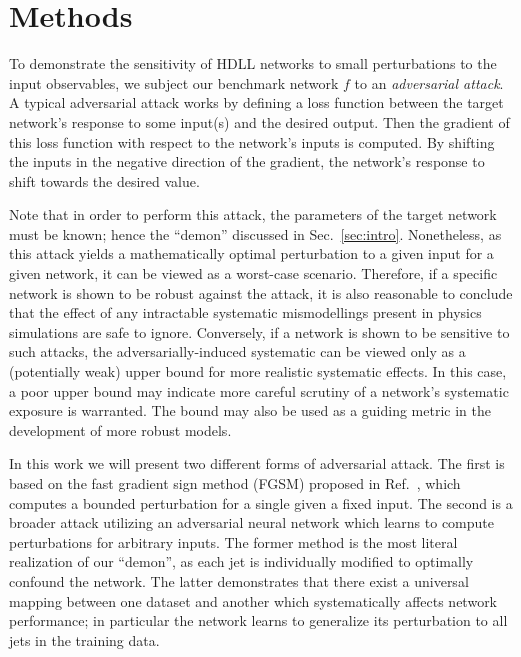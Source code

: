 \documentclass[reprint,nofootinbib,...]{revtex4-1}
\begin{document}

\section{Methods}
To demonstrate the sensitivity of HDLL networks to small perturbations to the input observables, we subject our benchmark network $f$ to an \textit{adversarial attack}.
A typical adversarial attack works by defining a loss function between the target network's response to some input(s) and the desired output.
Then the gradient of this loss function with respect to the network's inputs is computed.
By shifting the inputs in the negative direction of the gradient, the network's response to shift towards the desired value.

Note that in order to perform this attack, the parameters of the target network must be known; hence the ``demon'' discussed in Sec.~\ref{sec:intro}.
Nonetheless, as this attack yields a mathematically optimal perturbation to a given input for a given network, it can be viewed as a worst-case scenario.
Therefore, if a specific network is shown to be robust against the attack, it is also reasonable to conclude that the effect of any intractable systematic mismodellings present in physics simulations are safe to ignore.
Conversely, if a network is shown to be sensitive to such attacks, the adversarially-induced systematic can be viewed only as a (potentially weak) upper bound for more realistic systematic effects.
In this case, a poor upper bound may indicate more careful scrutiny of a network's systematic exposure is warranted.
The bound may also be used as a guiding metric in the development of more robust models.

In this work we will present two different forms of adversarial attack.
The first is based on the fast gradient sign method (FGSM) proposed in Ref.~\cite{DBLP:journals/corr/GoodfellowSS14}, which computes a bounded perturbation for a single given a fixed input.
The second is a broader attack utilizing an adversarial neural network which learns to compute perturbations for arbitrary inputs.
The former method is the most literal realization of our ``demon'', as each jet is individually modified to optimally confound the network.
The latter demonstrates that there exist a universal mapping between one dataset and another which systematically affects network performance; in particular the network learns to generalize its perturbation to all jets in the training data.
\end{document}
